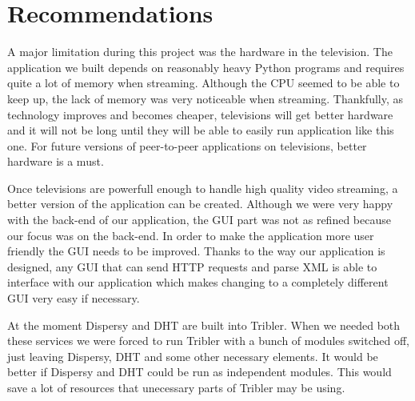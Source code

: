 \chapter{Recommendations}
\label{sec:recommendations}

A major limitation during this project was the hardware in the television. The application we built depends on reasonably heavy Python programs and requires quite a lot of memory when streaming. Although the CPU seemed to be able to keep up, the lack of memory was very noticeable when streaming. Thankfully, as technology improves and becomes cheaper, televisions will get better hardware and it will not be long until they will be able to easily run application like this one. For future versions of peer-to-peer applications on televisions, better hardware is a must.

Once televisions are powerfull enough to handle high quality video streaming, a better version of the application can be created. Although we were very happy with the back-end of our application, the GUI part was not as refined because our focus was on the back-end. In order to make the application more user friendly the GUI needs to be improved. Thanks to the way our application is designed, any GUI that can send HTTP requests and parse XML is able to interface with our application which makes changing to a completely different GUI very easy if necessary.

At the moment Dispersy and DHT are built into Tribler. When we needed both these services we were forced to run Tribler with a bunch of modules switched off, just leaving Dispersy, DHT and some other necessary elements. It would be better if Dispersy and DHT could be run as independent modules. This would save a lot of resources that unecessary parts of Tribler may be using.
